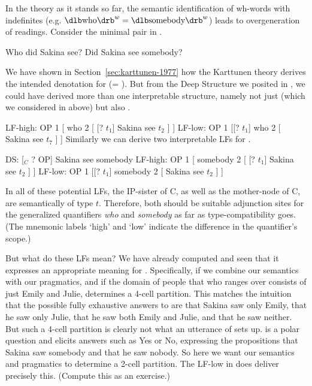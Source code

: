 In the theory as it stands so far, the semantic identification of wh-words with
indefinites (e.g. $\svt{who}^{w}=\svt{somebody}^{w}$) leads to overgeneration of readings.
Consider the minimal pair in \Next.

\pex\label{ex:wh-pol}
\a Who did Sakina see?
\a Did Sakina see somebody?
\xe

We have shown in Section~\ref{sec:karttunen-1977} how the Karttunen theory
derives the intended denotation for \Last[a] (= ). But from the
Deep Structure we posited in , we could have derived more
  than one interpretable structure, namely not just \Next[a] (which we
  considered in  above) but also \Next[b].

\pex\label{ex:wh-high-low}
\a LF-high: OP 1 [ who 2 [ [? $t_{1}$] Sakina see $t_{2}$ ] ]
\a LF-low: OP 1 [[? $t_{1}$] who 2 [ Sakina see $t_{7}$ ] ]
\xe
%
Similarly we can derive two interpretable LFs for \LLast[b].

\pex\label{ex:somebody-high-low}%
DS: [$_{C}$ ? OP] Sakina see somebody
\a LF-high: OP 1 [ somebody 2 [ [? $t_{1}$] Sakina see $t_{2}$ ] ]
\a LF-low: OP 1 [[? $t_{1}$] somebody 2 [ Sakina see $t_{2}$ ] ]
\xe

In all of these potential LFs, the IP-sister of C, as well as the mother-node of
C, are semantically of type $t$. Therefore, both should be suitable adjunction
sites for the generalized quantifiers \emph{who} and \emph{somebody} as far as
type-compatibility goes. (The mnemonic labels `high' and `low' indicate the
difference in the quantifier's scope.)

But what do these LFs mean? We have already computed 
and seen that it expresses an appropriate meaning for .
Specifically, if we combine our semantics with our pragmatics, and if the domain
of people that who ranges over consists of just Emily and Julie,
 determines a 4-cell partition. This matches the
intuition that the possible fully exhaustive answers to  are
that Sakina saw only Emily, that he saw only Julie, that he saw both Emily and Julie,
and that he saw neither. But such a 4-cell partition is clearly not what an
utterance of  sets up.  is a polar
question and elicits answers such as Yes or No, expressing the propositions that
Sakina saw somebody and that he saw nobody. So here we want our semantics and
pragmatics to determine a 2-cell partition. The LF-low in
 does deliver precisely this. (Compute this as an
exercise.)

